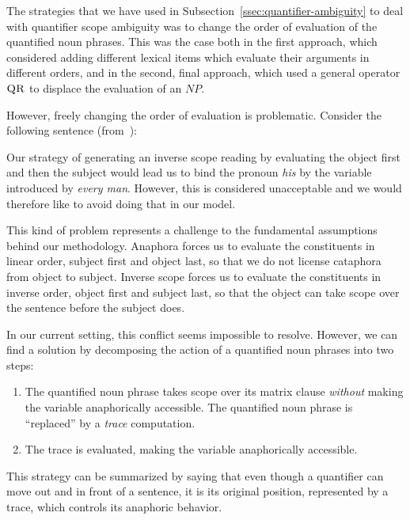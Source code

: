 The strategies that we have used in
Subsection~\ref{ssec:quantifier-ambiguity} to deal with quantifier scope
ambiguity was to change the order of evaluation of the quantified
noun phrases. This was the case both in the first approach, which
considered adding different lexical items which evaluate their arguments in
different orders, and in the second, final approach, which used a general
operator $\textsc{QR}$ to displace the evaluation of an $NP$.

However, freely changing the order of evaluation is problematic. Consider
the following sentence (from~\cite{shan2006explaining}):

\begin{exe}
\end{exe}

Our strategy of generating an inverse scope reading by evaluating the
object first and then the subject would lead us to bind the pronoun
\emph{his} by the variable introduced by \emph{every man}. However, this is
considered unacceptable and we would therefore like to avoid doing that in
our model.

This kind of problem represents a challenge to the fundamental assumptions
behind our methodology. Anaphora forces us to evaluate the constituents in
linear order, subject first and object last, so that we do not license
cataphora from object to subject. Inverse scope forces us to evaluate the
constituents in inverse order, object first and subject last, so that the
object can take scope over the sentence before the subject does.

In our current setting, this conflict seems impossible to resolve. However,
we can find a solution by decomposing the action of a quantified noun
phrases into two steps:

\begin{enumerate}
\item The quantified noun phrase takes scope over its matrix clause
  \emph{without} making the variable anaphorically accessible. The
  quantified noun phrase is ``replaced'' by a \emph{trace}
  computation.
\item The trace is evaluated, making the variable anaphorically accessible.
\end{enumerate}

This strategy can be summarized by saying that even though a quantifier can
move out and in front of a sentence, it is its original position,
represented by a trace, which controls its anaphoric behavior.

